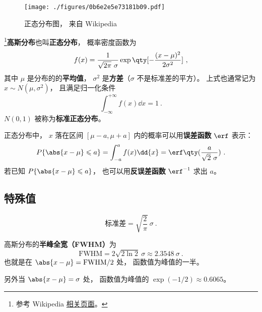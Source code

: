 

\begin{figure}[ht]
\centering
\texttt{[image: ./figures/0b6e2e5e73181b09.pdf]}
\caption{正态分布图， 来自 Wikipedia} \label{fig_GausPD_1}
\end{figure}

\footnote{参考 Wikipedia \href{https://en.wikipedia.org/wiki/Normal_distribution}{相关页面}。}\textbf{高斯分布}也叫\textbf{正态分布}， 概率密度函数为
\begin{equation}\label{eq_GausPD_1}
f(x) = \frac{1}{\sqrt{2\pi}\ \sigma} \exp\qty[-\frac{(x - \mu )^2}{2\sigma ^2}]~,
\end{equation}
其中 $\mu$ 是分布的的\textbf{平均值}， $\sigma^2$ 是\textbf{方差}（$\sigma$ 不是标准差的平方）。 上式也通常记为 $x \sim N(\mu,\sigma^2)$， 且满足归一化条件
\begin{equation}\label{eq_GausPD_7}
\int_{-\infty}^{+\infty} f(x) \dd{x} = 1~.
\end{equation}
$N(0,1)$ 被称为\textbf{标准正态分布}。

正态分布中， $x$ 落在区间 $[\mu-a,\mu+a]$ 内的概率可以用\textbf{误差函数} $\erf$ 表示：
\begin{equation}
P\{\abs{x-\mu} \leqslant a\} = \int_{-a}^a f(x)\dd{x} = \erf\qty(\frac{a}{\sqrt{2}\ \sigma})~.
\end{equation}
若已知 $P\{\abs{x-\mu} \leqslant a\}$， 也可以用\textbf{反误差函数} $\erf^{-1}$ 求出 $a$。

\subsection{特殊值}
\begin{equation}
\text{标准差} = \sqrt{\frac{2}{\pi}}\ \sigma~.
\end{equation}

高斯分布的\textbf{半峰全宽（FWHM）}为
\begin{equation}\label{eq_GausPD_8}
\text{FWHM} = 2\sqrt{2\ln 2}\ \sigma \approx 2.3548\ \sigma~.
\end{equation}
也就是在 $\abs{x - \mu} = \text{FWHM}/2$ 处， 函数值为峰值的一半。

另外当 $\abs{x - \mu} = \sigma$ 处， 函数值为峰值的 $\exp(-1/2) \approx 0.6065$。

